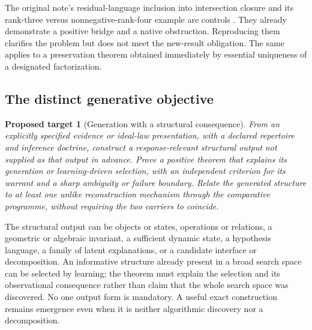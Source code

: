 \documentclass[11pt]{article}
\newtheorem{target}[definition]{Proposed target}
\theoremstyle{remark}
\begin{document}
The original note's residual-language inclusion into intersection closure and its rank-three versus nonnegative-rank-four example are controls \cite{TwoSidedNote}. They already demonstrate a positive bridge and a native obstruction. Reproducing them clarifies the problem but does not meet the new-result obligation. The same applies to a preservation theorem obtained immediately by essential uniqueness of a designated factorization.

\subsection{The distinct generative objective}

\begin{target}[Generation with a structural consequence]
\label{target:generative}
From an explicitly specified evidence or ideal-law presentation, with a declared repertoire and inference doctrine, construct a response-relevant structural output not supplied as that output in advance. Prove a positive theorem that explains its generation or learning-driven selection, with an independent criterion for its warrant and a sharp ambiguity or failure boundary. Relate the generated structure to at least one unlike reconstruction mechanism through the comparative programme, without requiring the two carriers to coincide.
\end{target}

The structural output can be objects or states, operations or relations, a geometric or algebraic invariant, a sufficient dynamic state, a hypothesis language, a family of latent explanations, or a candidate interface or decomposition. An informative structure already present in a broad search space can be selected by learning; the theorem must explain the selection and its observational consequence rather than claim that the whole search space was discovered. No one output form is mandatory. A useful exact construction remains emergence even when it is neither algorithmic discovery nor a decomposition.
\end{document}
